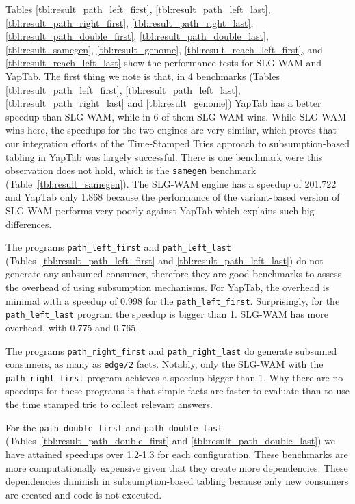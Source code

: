 Tables \ref{tbl:result_path_left_first},
\ref{tbl:result_path_left_last},
\ref{tbl:result_path_right_first},
\ref{tbl:result_path_right_last},
\ref{tbl:result_path_double_first},
\ref{tbl:result_path_double_last},
\ref{tbl:result_samegen},
\ref{tbl:result_genome},
\ref{tbl:result_reach_left_first},
and \ref{tbl:result_reach_left_last} show the performance tests for SLG-WAM and YapTab.
The first thing we note is that, in 4 benchmarks (Tables \ref{tbl:result_path_left_first},
\ref{tbl:result_path_left_last}, \ref{tbl:result_path_right_last} and \ref{tbl:result_genome})
YapTab has a better speedup than SLG-WAM, while in 6 of them SLG-WAM wins. While SLG-WAM wins here,
the speedups for the two engines are very similar, which proves that our integration
efforts of the Time-Stamped Tries approach to subsumption-based tabling in YapTab was largely successful.
There is one benchmark were this observation does not hold, which is the \texttt{samegen}
benchmark (Table~\ref{tbl:result_samegen}).
The SLG-WAM engine has a speedup of 201.722 and YapTab only 1.868 because the performance
of the variant-based version of SLG-WAM performs very poorly against YapTab which explains such big differences.

The programs \texttt{path\_left\_first} and \texttt{path\_left\_last} (Tables~\ref{tbl:result_path_left_first}
and \ref{tbl:result_path_left_last}) do not generate any subsumed consumer,
therefore they are good benchmarks to assess the overhead of using subsumption mechanisms. For YapTab,
the overhead is minimal with a speedup of 0.998 for the \texttt{path\_left\_first}. Surprisingly, for the
\texttt{path\_left\_last} program the speedup is bigger than 1. SLG-WAM has more overhead, with 0.775 and 0.765.

The programs \texttt{path\_right\_first} and \texttt{path\_right\_last} do generate subsumed consumers,
as many as \texttt{edge/2} facts. Notably, only the SLG-WAM with the \texttt{path\_right\_first} program
achieves a speedup bigger than 1. Why there are no speedups for these programs is that simple facts
are faster to evaluate than to use the time stamped trie to collect relevant answers.

For the \texttt{path\_double\_first} and \texttt{path\_double\_last} (Tables~\ref{tbl:result_path_double_first}
and \ref{tbl:result_path_double_last}) we have attained speedups over 1.2-1.3
for each configuration. These benchmarks are more computationally expensive given that they create more
dependencies. These dependencies diminish in subsumption-based tabling because only new consumers are created
and code is not executed.

